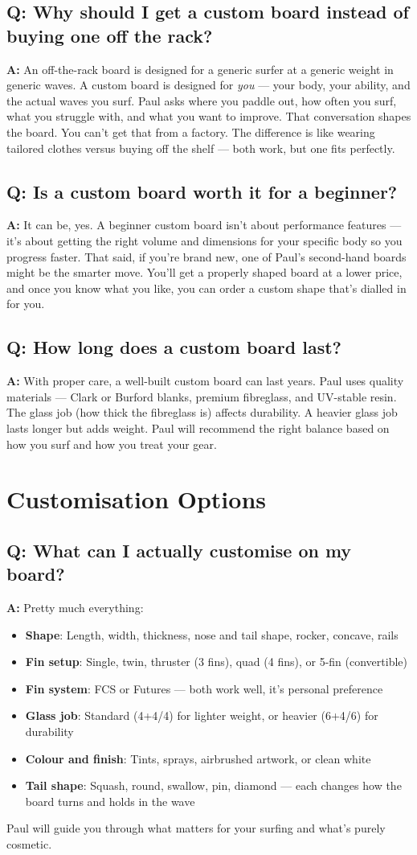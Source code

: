 \documentclass[11pt,a4paper]{article}
\newcommand{\question}[1]{\subsection*{Q: #1}}
\newcommand{\answer}{\noindent\textbf{A:} }
\begin{document}
\question{Why should I get a custom board instead of buying one off the rack?}
\answer An off-the-rack board is designed for a generic surfer at a generic weight in generic waves. A custom board is designed for \emph{you} --- your body, your ability, and the actual waves you surf. Paul asks where you paddle out, how often you surf, what you struggle with, and what you want to improve. That conversation shapes the board. You can't get that from a factory. The difference is like wearing tailored clothes versus buying off the shelf --- both work, but one fits perfectly.

\question{Is a custom board worth it for a beginner?}
\answer It can be, yes. A beginner custom board isn't about performance features --- it's about getting the right volume and dimensions for your specific body so you progress faster. That said, if you're brand new, one of Paul's second-hand boards might be the smarter move. You'll get a properly shaped board at a lower price, and once you know what you like, you can order a custom shape that's dialled in for you.

\question{How long does a custom board last?}
\answer With proper care, a well-built custom board can last years. Paul uses quality materials --- Clark or Burford blanks, premium fibreglass, and UV-stable resin. The glass job (how thick the fibreglass is) affects durability. A heavier glass job lasts longer but adds weight. Paul will recommend the right balance based on how you surf and how you treat your gear.

\section{Customisation Options}

\question{What can I actually customise on my board?}
\answer Pretty much everything:
\begin{itemize}[leftmargin=1.5em]
    \item \textbf{Shape}: Length, width, thickness, nose and tail shape, rocker, concave, rails
    \item \textbf{Fin setup}: Single, twin, thruster (3 fins), quad (4 fins), or 5-fin (convertible)
    \item \textbf{Fin system}: FCS or Futures --- both work well, it's personal preference
    \item \textbf{Glass job}: Standard (4+4/4) for lighter weight, or heavier (6+4/6) for durability
    \item \textbf{Colour and finish}: Tints, sprays, airbrushed artwork, or clean white
    \item \textbf{Tail shape}: Squash, round, swallow, pin, diamond --- each changes how the board turns and holds in the wave
\end{itemize}
Paul will guide you through what matters for your surfing and what's purely cosmetic.
\end{document}
